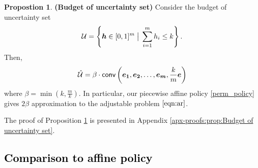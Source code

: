 \documentclass[11pt]{article}
\theoremstyle{plain}
\theoremstyle{definition}
\newtheorem{prop}[theorem]{Propostion}
\numberwithin{equation}{section}%
\numberwithin{equation}{section}%
\newcommand{\mb}[1]{\ensuremath{\boldsymbol{#1}}}
\newcommand*{\red}{\textcolor{black}}
\begin{document}
\begin{prop} {\bf{(Budget of uncertainty set)}} \label{prop:Budget of uncertainty set} Consider the budget of uncertainty set
\begin{equation}\label{set:budget of uncertainty}
\red{ {\cal U}= \left\{ \mb h \in [0,1]^{m} \;  \big\vert \; \sum_{i=1}^m h_i \leq k \right\}.}
\end{equation}
Then, $$ \hat{ \cal U} = \beta \cdot {\sf{conv}} \left( \mb{e_1}, \mb{e_2},\ldots, \mb{e_m}, \frac{k}{m} \mb e \right)$$ where $ \beta = \min \left( k, \frac{m}{k}\right) $.
 In particular, our piecewise affine policy \eqref{perm_policy} gives $ 2 \beta $ approximation to the adjustable problem $\eqref{eqn:ar}$.
\end{prop}
The proof of Proposition \ref{prop:Budget of uncertainty set} is presented in Appendix \ref{apx-proofs:prop:Budget of uncertainty set}.
\red{
\subsection{Comparison to affine policy}}
\end{document}

